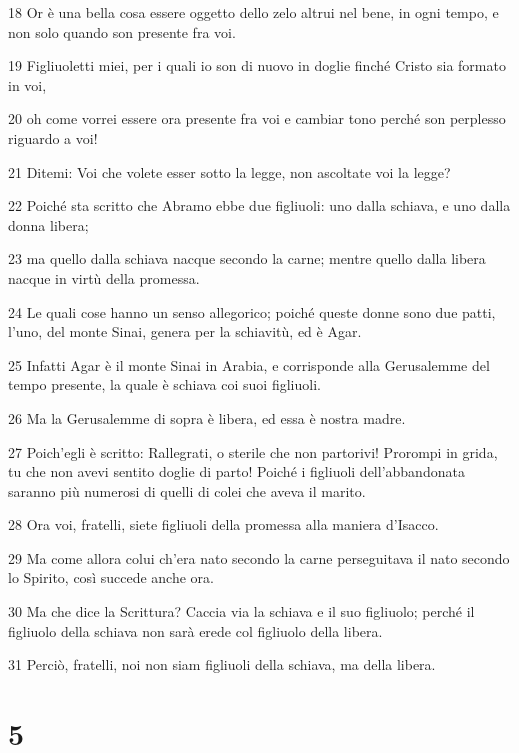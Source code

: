 \par 18 Or è una bella cosa essere oggetto dello zelo altrui nel bene, in ogni tempo, e non solo quando son presente fra voi.
\par 19 Figliuoletti miei, per i quali io son di nuovo in doglie finché Cristo sia formato in voi,
\par 20 oh come vorrei essere ora presente fra voi e cambiar tono perché son perplesso riguardo a voi!
\par 21 Ditemi: Voi che volete esser sotto la legge, non ascoltate voi la legge?
\par 22 Poiché sta scritto che Abramo ebbe due figliuoli: uno dalla schiava, e uno dalla donna libera;
\par 23 ma quello dalla schiava nacque secondo la carne; mentre quello dalla libera nacque in virtù della promessa.
\par 24 Le quali cose hanno un senso allegorico; poiché queste donne sono due patti, l'uno, del monte Sinai, genera per la schiavitù, ed è Agar.
\par 25 Infatti Agar è il monte Sinai in Arabia, e corrisponde alla Gerusalemme del tempo presente, la quale è schiava coi suoi figliuoli.
\par 26 Ma la Gerusalemme di sopra è libera, ed essa è nostra madre.
\par 27 Poich'egli è scritto: Rallegrati, o sterile che non partorivi! Prorompi in grida, tu che non avevi sentito doglie di parto! Poiché i figliuoli dell'abbandonata saranno più numerosi di quelli di colei che aveva il marito.
\par 28 Ora voi, fratelli, siete figliuoli della promessa alla maniera d'Isacco.
\par 29 Ma come allora colui ch'era nato secondo la carne perseguitava il nato secondo lo Spirito, così succede anche ora.
\par 30 Ma che dice la Scrittura? Caccia via la schiava e il suo figliuolo; perché il figliuolo della schiava non sarà erede col figliuolo della libera.
\par 31 Perciò, fratelli, noi non siam figliuoli della schiava, ma della libera.

\chapter{5}

